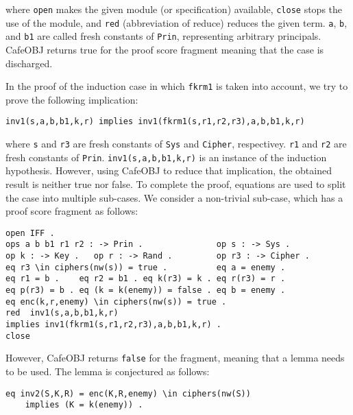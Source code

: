 \documentclass[a4paper,fleqn]{cas-dc}
\begin{document}
\noindent
where \verb!open! makes the given module (or specification) available, \verb!close! stops the use of the module, and \verb!red! (abbreviation of reduce) reduces the given term. \verb!a!, \verb!b!, and \verb!b1! are called fresh constants of \verb!Prin!, representing arbitrary principals. CafeOBJ returns true for the proof score fragment meaning that the case is discharged.

In the proof of the induction case in which \verb!fkrm1! is taken into account, we try to prove the following implication:

\begin{small}
	\begin{verbatim}
inv1(s,a,b,b1,k,r) implies inv1(fkrm1(s,r1,r2,r3),a,b,b1,k,r)
\end{verbatim}
\end{small}
 
\noindent
where \verb!s! and \verb!r3! are fresh constants of \verb!Sys! and \verb!Cipher!, respectivey.
\verb!r1! and \verb!r2! are fresh constants of \verb!Prin!.
 \verb!inv1(s,a,b,b1,k,r)! is an instance of the induction hypothesis. However, using CafeOBJ to reduce that implication, the obtained result is neither true nor false. To complete the proof, equations are used to split the case into multiple sub-cases. We consider a non-trivial sub-case, which has a proof score fragment as follows:

\begin{small}
\begin{verbatim}
open IFF .
ops a b b1 r1 r2 : -> Prin .               op s : -> Sys .
op k : -> Key .   op r : -> Rand .         op r3 : -> Cipher .
eq r3 \in ciphers(nw(s)) = true .          eq a = enemy .  
eq r1 = b .    eq r2 = b1 . eq k(r3) = k . eq r(r3) = r .  
eq p(r3) = b . eq (k = k(enemy)) = false . eq b = enemy .
eq enc(k,r,enemy) \in ciphers(nw(s)) = true .
red  inv1(s,a,b,b1,k,r) 
implies inv1(fkrm1(s,r1,r2,r3),a,b,b1,k,r) .
close
\end{verbatim}
\end{small}

\noindent
However, CafeOBJ returns \verb!false! for the fragment, meaning that a lemma needs to be used. The lemma is conjectured as follows: 

\begin{small}
	\begin{verbatim}
eq inv2(S,K,R) = enc(K,R,enemy) \in ciphers(nw(S)) 
	implies (K = k(enemy)) .
	\end{verbatim}
\end{small}
\end{document}
